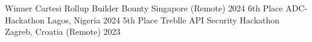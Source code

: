 \begin{cvhonors}
    \cvhonor
    {Winner} %
    {Cartesi Rollup Builder Bounty} %
    {Singapore (Remote) } %
    {2024} %
    \cvhonor
    {6th Place} %
    {ADC-Hackathon} %
    {Lagos, Nigeria} %
    {2024} %
    \cvhonor
    {5th Place} %
    {Treblle API Security Hackathon} %
    {Zagreb, Croatia (Remote)} %
    {2023} %

\end{cvhonors}